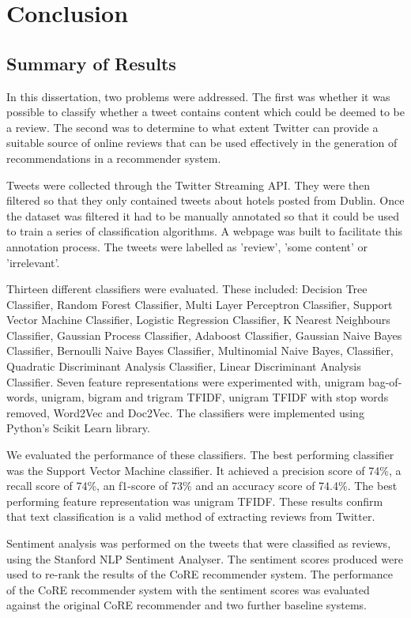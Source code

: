 \chapter{Conclusion}

\section{Summary of Results}

In this dissertation, two problems were addressed. The first was whether it was possible to classify whether a tweet contains content which could be deemed to be a review. The second was to determine to what extent Twitter can provide a suitable source of online reviews that can be used effectively in the generation of recommendations in a recommender system.

Tweets were collected through the Twitter Streaming API. They were then filtered so that they only contained tweets about hotels posted from Dublin. Once the dataset was filtered it had to be manually annotated so that it could be used to train a series of classification algorithms. A webpage was built to facilitate this annotation process. The tweets were labelled as 'review', 'some content' or 'irrelevant'.

Thirteen different classifiers were evaluated. These included: Decision Tree Classifier, Random Forest Classifier, Multi Layer Perceptron Classifier, Support Vector Machine Classifier, Logistic Regression Classifier, K Nearest Neighbours Classifier, Gaussian Process Classifier, Adaboost Classifier, Gaussian Naive Bayes Classifier, Bernoulli Naive Bayes Classifier, Multinomial Naive Bayes, Classifier, Quadratic Discriminant Analysis Classifier, Linear Discriminant Analysis Classifier. Seven feature representations were experimented with, unigram bag-of-words, unigram, bigram and trigram TFIDF, unigram TFIDF with stop words removed, Word2Vec and Doc2Vec. The classifiers were implemented using Python's Scikit Learn library.

We evaluated the performance of these classifiers. The best performing classifier was the Support Vector Machine classifier. It achieved a precision score of 74\%, a recall score of 74\%, an f1-score of 73\% and an accuracy score of 74.4\%. The best performing feature representation was unigram TFIDF. These results confirm that text classification is a valid method of extracting reviews from Twitter. 

Sentiment analysis was performed on the tweets that were classified as reviews, using the Stanford NLP Sentiment Analyser. The sentiment scores produced were used to re-rank the results of the CoRE recommender system. The performance of the CoRE recommender system with the sentiment scores was evaluated against the original CoRE recommender and two further baseline systems.

